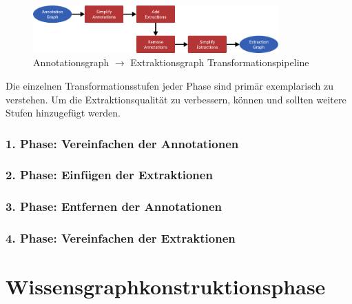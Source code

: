 \begin{figure}[h]
	\centering
	\includegraphics[width=0.84\textwidth]{gfx/text2kg/transformationPipeline.pdf}
	\caption{Annotationsgraph $\rightarrow$ Extraktionsgraph Transformationspipeline}\label{fig:text2kg:transformationPipeline}
\end{figure}
Die einzelnen Transformationsstufen jeder Phase sind primär exemplarisch zu verstehen.
Um die Extraktionsqualität zu verbessern, können und sollten weitere Stufen hinzugefügt werden.

\subsubsection{1. Phase: Vereinfachen der Annotationen}

\subsubsection{2. Phase: Einfügen der Extraktionen}

\subsubsection{3. Phase: Entfernen der Annotationen}

\subsubsection{4. Phase: Vereinfachen der Extraktionen}

\section{Wissensgraphkonstruktionsphase}%
\label{sec:text2kg:psl}
